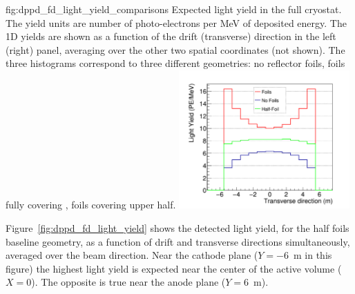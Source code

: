 \begin{dunefigure}{fig:dppd_fd_light_yield_comparisons}
{Expected light yield in the full   cryostat. The yield units are number of photo-electrons per \si{\MeV} of deposited energy. The 1D yields are shown as a function of the drift (transverse) direction in the left (right) panel, averaging over the other two spatial coordinates (not shown). The three histograms correspond to three different geometries: no  reflector foils, foils fully covering , foils covering upper  half.}
 \hfill
\includegraphics[width=0.49\textwidth]{graphics/dppd_PhotLibProjectionComparison_Trans.pdf}
\end{dunefigure}
 

Figure~\ref{fig:dppd_fd_light_yield} shows the detected light yield, for the half foils baseline geometry, as a function of drift and transverse directions simultaneously, averaged over the beam direction. Near the cathode plane ($Y=$\SI{-6}{m} in this figure) the highest light yield is expected near the center of the active volume ($X=0$). The opposite is true near the anode plane ($Y=$\SI{+6}{m}).  

